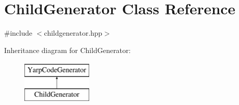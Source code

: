\hypertarget{classChildGenerator}{\section{Child\-Generator Class Reference}
\label{classChildGenerator}
}


{\ttfamily \#include $<$childgenerator.\-hpp$>$}

Inheritance diagram for Child\-Generator\-:\begin{figure}[H]
\begin{center}
\leavevmode
\includegraphics[height=2.000000cm]{classChildGenerator}
\end{center}
\end{figure}
